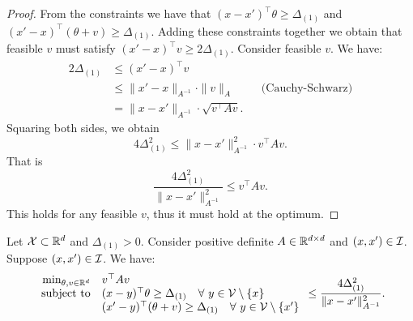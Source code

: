 \begin{proof}
    From the constraints we have that $(x - x')^\top\theta\geq \Delta_{(1)}$ and $(x' - x)^\top(\theta + v)\geq \Delta_{(1)}$. Adding these constraints together we obtain that feasible $v$ must satisfy $(x' - x)^\top v \geq 2\Delta_{(1)}$. Consider feasible $v$. We have: \begin{align*}
    2\Delta_{(1)} &\leq  (x' - x)^\top v \\
    &\leq \|x'-x\|_{A^{-1}} \cdot \|v\|_{A} && \text{(Cauchy-Schwarz)}\\
    &= \|x-x'\|_{A^{-1}} \cdot \sqrt{v^{\top}Av}.
\end{align*}
Squaring both sides, we obtain \begin{equation}4\Delta_{(1)}^2 \leq \|x-x'\|_{A^{-1}}^2 \cdot v^{\top}Av.\end{equation}
That is 
\begin{equation}\frac{4\Delta_{(1)}^2}{\|x-x'\|_{A^{-1}}^2} \leq v^{\top}Av.\end{equation}
This holds for any feasible $v$, thus it must hold at the optimum.
\end{proof}

\begin{lemma} \label{lem:optupper}
    Let $\mathcal{X} \subset \mathbb{R}^d$ and $\Delta_{(1)} > 0$. Consider positive definite $A \in \mathbb{R}^{d\times d}$ and $(x,x') \in \mathcal{I}$. Suppose $(x,x') \in \mathcal{I}$. We have:
\begin{equation}\begin{array}{rl}
    \min_{\theta, v\in\mathbb{R}^d} & v^\top Av \\
    \mbox{\rm subject to} & (x - y)^\top\theta\geq \Delta_{(1)} \quad\forall~y \in \mathcal{V} \setminus \{x\}\\
    & (x' - y)^\top(\theta + v)\geq \Delta_{(1)}\quad\forall~ y \in \mathcal{V} \setminus \{x'\}
\end{array} \leq \frac{4\Delta_{(1)}^2}{\|x - x'\|^2_{A^{-1}}}.\end{equation}
\end{lemma}

